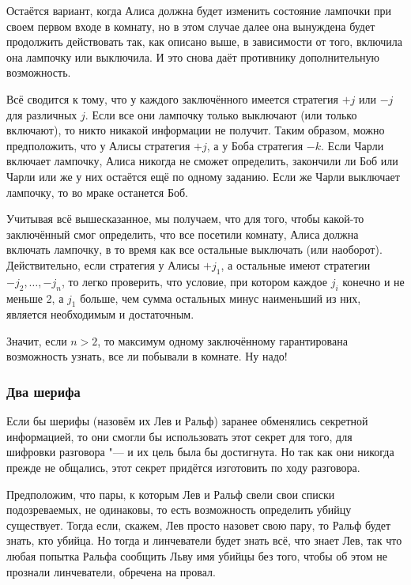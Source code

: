 \documentclass[twoside]{book}
\begin{document}
Остаётся вариант, когда Алиса должна будет изменить состояние
лампочки при своем первом входе в комнату, но в этом случае далее она вынуждена будет продолжить действовать так, как описано выше, в зависимости от того, включила она лампочку или выключила.
И это снова даёт противнику дополнительную возможность.

Всё сводится к тому, что у каждого заключённого имеется стратегия $+j$ или $-j$ для различных $j$.
Если все они лампочку только выключают (или только включают), то никто
никакой информации не получит.
Таким образом, можно предположить, что у Алисы стратегия $+j$, а у Боба стратегия $-k$.
Если Чарли включает лампочку, Алиса никогда не сможет определить, закончили ли Боб или Чарли или же у них остаётся ещё по одному заданию.
Если же Чарли выключает лампочку, то во мраке останется Боб.

Учитывая всё вышесказанное, мы получаем, что для того, чтобы какой-то заключённый смог определить, что все посетили комнату,
Алиса должна включать лампочку, в то время как все остальные выключать (или наоборот).
Действительно, если стратегия у Алисы $+j_1$, а остальные имеют стратегии  $-j_2,\dots,-j_n$, то легко проверить, что условие, при котором каждое $j_i$ конечно и не меньше 2, а $j_1$ больше, чем сумма остальных минус наименьший из них, является необходимым и достаточным.

Значит, если $n>2$, то максимум одному заключённому гарантирована возможность узнать, все ли побывали в комнате.
Ну надо!

\subsubsection*{Два шерифа}%

Если бы шерифы (назовём их Лев и Ральф) заранее обменялись
секретной информацией, то они смогли бы использовать этот секрет для
того, для шифровки разговора "--- и их цель была бы
достигнута.
Но так как они никогда прежде не общались,
этот секрет придётся изготовить по ходу раз\-го\-вора.
{\par}

\medskip

Предположим, что пары, к которым Лев и Ральф свели свои списки подозреваемых, не одинаковы, то есть возможность определить убийцу существует.
Тогда если, скажем, Лев просто назовет свою пару, то Ральф будет знать, кто убийца.
Но тогда и линчеватели будет знать всё, что знает Лев, так что любая попытка Ральфа сообщить Льву имя убийцы без того, чтобы об этом не прознали линчеватели, обречена на провал.
\end{document}
